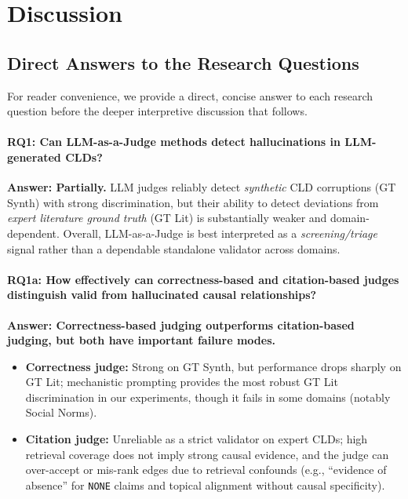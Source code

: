 \chapter{Discussion}
\label{sec:discussion}



\section{Direct Answers to the Research Questions}
\label{sec:discussion_rq_answers}
For reader convenience, we provide a direct, concise answer to each research question before the deeper interpretive discussion that follows.

\subsubsection*{RQ1: Can LLM-as-a-Judge methods detect hallucinations in LLM-generated CLDs?}
\textbf{Answer: Partially.} LLM judges reliably detect \textit{synthetic} CLD corruptions (GT Synth) with strong discrimination, but their ability to detect deviations from \textit{expert literature ground truth} (GT Lit) is substantially weaker and domain-dependent. Overall, LLM-as-a-Judge is best interpreted as a \textit{screening/triage} signal rather than a dependable standalone validator across domains.

\subsubsection*{RQ1a: How effectively can correctness-based and citation-based judges distinguish valid from hallucinated causal relationships?}
\textbf{Answer: Correctness-based judging outperforms citation-based judging, but both have important failure modes.}
\begin{itemize}[noitemsep]
    \item \textbf{Correctness judge:} Strong on GT Synth, but performance drops sharply on GT Lit; mechanistic prompting provides the most robust GT Lit discrimination in our experiments, though it fails in some domains (notably Social Norms).
    \item \textbf{Citation judge:} Unreliable as a strict validator on expert CLDs; high retrieval coverage does not imply strong causal evidence, and the judge can over-accept or mis-rank edges due to retrieval confounds (e.g., ``evidence of absence'' for \texttt{NONE} claims and topical alignment without causal specificity).
\end{itemize}

